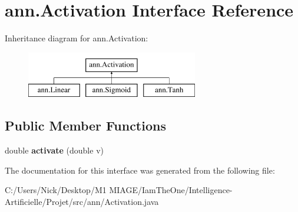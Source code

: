 \hypertarget{interfaceann_1_1_activation}{}\section{ann.\+Activation Interface Reference}
\label{interfaceann_1_1_activation}
Inheritance diagram for ann.\+Activation\+:\begin{figure}[H]
\begin{center}
\leavevmode
\includegraphics[height=2.000000cm]{interfaceann_1_1_activation}
\end{center}
\end{figure}
\subsection*{Public Member Functions}
\begin{DoxyCompactItemize}
\item 
\mbox{\label{interfaceann_1_1_activation_a792856c4231dfcccc7cf7ab9739bc48f}} 
double {\bfseries activate} (double v)
\end{DoxyCompactItemize}


The documentation for this interface was generated from the following file\+:\begin{DoxyCompactItemize}
\item 
C\+:/\+Users/\+Nick/\+Desktop/\+M1 M\+I\+A\+G\+E/\+Iam\+The\+One/\+Intelligence-\/\+Artificielle/\+Projet/src/ann/Activation.\+java\end{DoxyCompactItemize}
